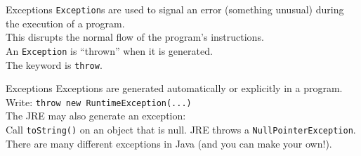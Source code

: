 \documentclass[aspectratio=169]{beamer}
\begin{document}
\begin{frame}{Exceptions}
\texttt{Exception}s are used to signal an error (something unusual) during the execution of a program. \\
\vspace{1em}
This disrupts the normal flow of the program's instructions. \\
\vspace{1em}
An \texttt{Exception} is ``thrown'' when it is generated. \\
\vspace{1em}
The keyword is \texttt{throw}. \\
\end{frame}



\begin{frame}{Exceptions}
Exceptions are generated automatically or explicitly in a program.\\
\vspace{1em}
Write: \texttt{throw new RuntimeException(...)} \\
\vspace{1em}
The JRE may also generate an exception: \\
\vspace{1em}
Call \texttt{toString()} on an object that is null. JRE throws a \texttt{NullPointerException}. \\
\vspace{1em}
There are many different exceptions in Java (and you can make your own!). \\
\end{frame}
\end{document}
